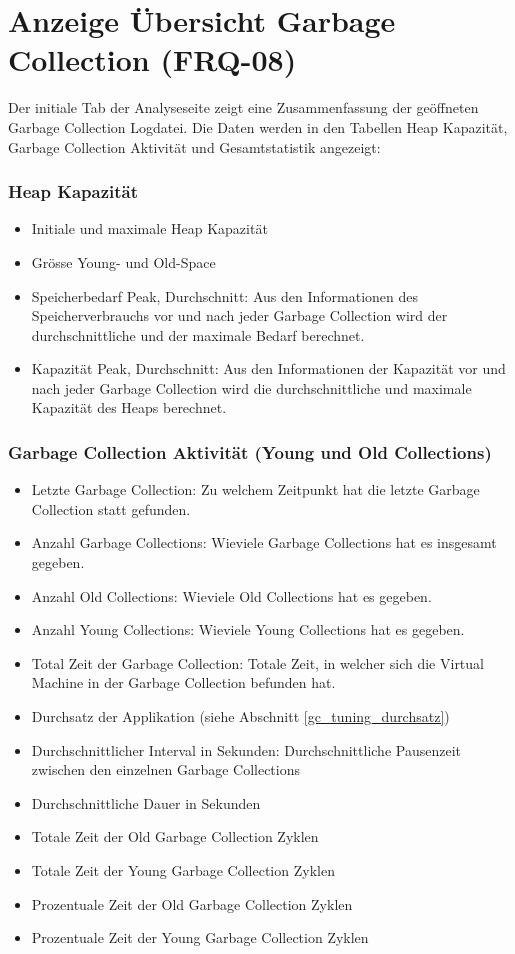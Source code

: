 \section{Anzeige Übersicht Garbage Collection (FRQ-08)}\label{standardreport}
Der initiale Tab der Analyseseite zeigt eine Zusammenfassung der geöffneten Garbage Collection Logdatei. Die Daten werden in den Tabellen Heap Kapazität, Garbage Collection Aktivität und Gesamtstatistik angezeigt:

\subsubsection{Heap Kapazität}
\begin{itemize}
	\item Initiale und maximale Heap Kapazität
	\item Grösse Young- und Old-Space
	\item Speicherbedarf Peak, Durchschnitt: Aus den Informationen des Speicherverbrauchs vor und nach jeder Garbage Collection wird der durchschnittliche und der maximale Bedarf berechnet.
	\item Kapazität Peak, Durchschnitt: Aus den Informationen der Kapazität vor und nach jeder Garbage Collection wird die durchschnittliche und maximale Kapazität des Heaps berechnet.

\end{itemize}
\subsubsection{Garbage Collection Aktivität (Young und Old Collections)}
\begin{itemize}
	\item Letzte Garbage Collection: Zu welchem Zeitpunkt hat die letzte Garbage Collection statt gefunden.
	\item Anzahl Garbage Collections: Wieviele Garbage Collections hat es insgesamt gegeben.
	\item  Anzahl Old Collections: Wieviele Old Collections hat es gegeben.
	\item Anzahl Young Collections: Wieviele Young Collections hat es gegeben.
	\item Total Zeit der Garbage Collection: Totale Zeit, in welcher sich die Virtual Machine in der Garbage Collection befunden hat.
	\item Durchsatz der Applikation (siehe Abschnitt \ref{gc_tuning_durchsatz})

	\item Durchschnittlicher Interval in Sekunden: Durchschnittliche Pausenzeit zwischen den einzelnen Garbage Collections
	\item Durchschnittliche Dauer in Sekunden
	\item Totale Zeit der Old Garbage Collection Zyklen
	\item Totale Zeit der Young Garbage Collection Zyklen
	\item Prozentuale Zeit der Old Garbage Collection Zyklen
	\item Prozentuale Zeit der Young Garbage Collection Zyklen
\end{itemize}	

